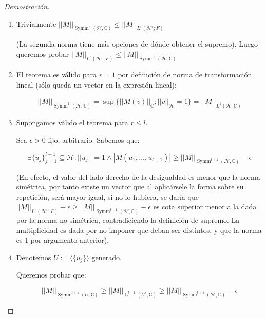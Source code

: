 \begin{proof}[Demostración]
	
	\begin{enumerate}
		\item Trivialmente $||M||_{\operatorname{Symm}^r(\mathcal{H}, \mathbb{C})} \leq ||M||_{L^r(\mathcal{H}^r;F)}$
		
		(La segunda norma tiene más opciones de dónde obtener el supremo). 
		Luego queremos probar $||M||_{L^r(\mathcal{H}^r;F)} \leq ||M||_{\operatorname{Symm}^r(\mathcal{H}, \mathbb{C})}$
		
		
		\item El teorema es válido para $r = 1$ por definición de norma de transformación lineal (sólo queda un vector en la expresión lineal):
		
		\begin{align*}
			||M||_{\operatorname{Symm}^1(\mathcal{H}, \mathbb{C})}=  \sup \{||M(v)||_\mathbb{C} : ||v||_{\mathcal{H}} = 1 \} = ||M||_{L^1(\mathcal{H}, \mathbb{C})} 
		\end{align*}
		
		\item  Supongamos válido el teorema para $r\leq l$.
		
		Sea $\epsilon >0$ fijo, arbitrario. Sabemos que:
		
		\begin{equation*}
			\exists \{u_j\}_{j = 1}^{l+1}\subseteq \mathcal{H} : ||u_j|| = 1 \land |M(u_1,\dots, u_{l+1})|\geq ||M||_{\operatorname{Symm}^{l+1}(\mathcal{H}, \mathbb{C})} - \epsilon
		\end{equation*}
		
		(En efecto, el valor del lado derecho de la desigualdad es menor que la norma simétrica, por tanto existe un vector que al aplicársele la forma sobre su repetición, será mayor igual, si no lo hubiera, se daría que $||M||_{L^r(\mathcal{H}^r;F)} - \epsilon \geq ||M||_{\operatorname{Symm}^{l+1}(\mathcal{H}, \mathbb{C})}-\epsilon$ es cota superior menor a la dada por la norma no simétrica, contradiciendo la definición de supremo. La multiplicidad es dada por no imponer que deban ser distintos, y que la norma es 1 por argumento anterior).
		
		\item Denotemos $ U := \langle\{u_j \}\rangle $ generado.
		
		Queremos probar que:
		
		\begin{equation*}
			||M||_{\operatorname{Symm}^{l+1}(U, \mathbb{C})}\geq ||M||_{\operatorname{L}^{l+1}(U^r, \mathbb{C})} \geq  ||M||_{\operatorname{Symm}^{l+1}(\mathcal{H}, \mathbb{C})}-\epsilon
		\end{equation*}
		

\end{enumerate}
\end{proof}
